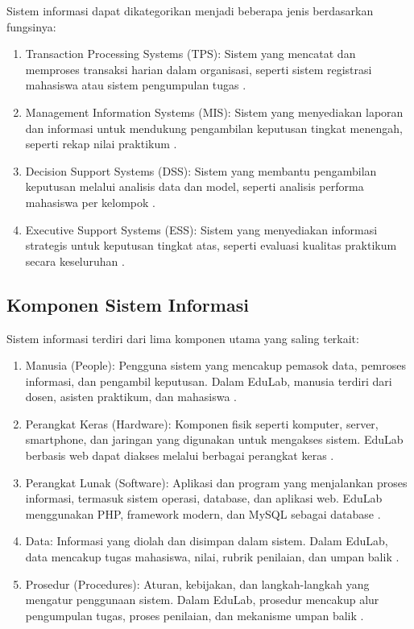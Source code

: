 \documentclass[12pt,a4paper,twoside]{report}
\begin{document}
Sistem informasi dapat dikategorikan menjadi beberapa jenis berdasarkan fungsinya:
\begin{enumerate}
    \item Transaction Processing Systems (TPS): Sistem yang mencatat dan memproses transaksi harian dalam organisasi, seperti sistem registrasi mahasiswa atau sistem pengumpulan tugas \cite{stair2018}.
    \item Management Information Systems (MIS): Sistem yang menyediakan laporan dan informasi untuk mendukung pengambilan keputusan tingkat menengah, seperti rekap nilai praktikum \cite{stair2018}.
    \item Decision Support Systems (DSS): Sistem yang membantu pengambilan keputusan melalui analisis data dan model, seperti analisis performa mahasiswa per kelompok \cite{stair2018}.
    \item Executive Support Systems (ESS): Sistem yang menyediakan informasi strategis untuk keputusan tingkat atas, seperti evaluasi kualitas praktikum secara keseluruhan \cite{stair2018}.
\end{enumerate}

\subsection{Komponen Sistem Informasi}

Sistem informasi terdiri dari lima komponen utama yang saling terkait:

\begin{enumerate}
    \item Manusia (People): Pengguna sistem yang mencakup pemasok data, pemroses informasi, dan pengambil keputusan. Dalam EduLab, manusia terdiri dari dosen, asisten praktikum, dan mahasiswa \cite{laudon2016}.
    
    \item Perangkat Keras (Hardware): Komponen fisik seperti komputer, server, smartphone, dan jaringan yang digunakan untuk mengakses sistem. EduLab berbasis web dapat diakses melalui berbagai perangkat keras \cite{stair2018}.
    
    \item Perangkat Lunak (Software): Aplikasi dan program yang menjalankan proses informasi, termasuk sistem operasi, database, dan aplikasi web. EduLab menggunakan PHP, framework modern, dan MySQL sebagai database \cite{stair2018}.
    
    \item Data: Informasi yang diolah dan disimpan dalam sistem. Dalam EduLab, data mencakup tugas mahasiswa, nilai, rubrik penilaian, dan umpan balik \cite{laudon2016}.
    
    \item Prosedur (Procedures): Aturan, kebijakan, dan langkah-langkah yang mengatur penggunaan sistem. Dalam EduLab, prosedur mencakup alur pengumpulan tugas, proses penilaian, dan mekanisme umpan balik \cite{stair2018}.
\end{enumerate}
\end{document}
